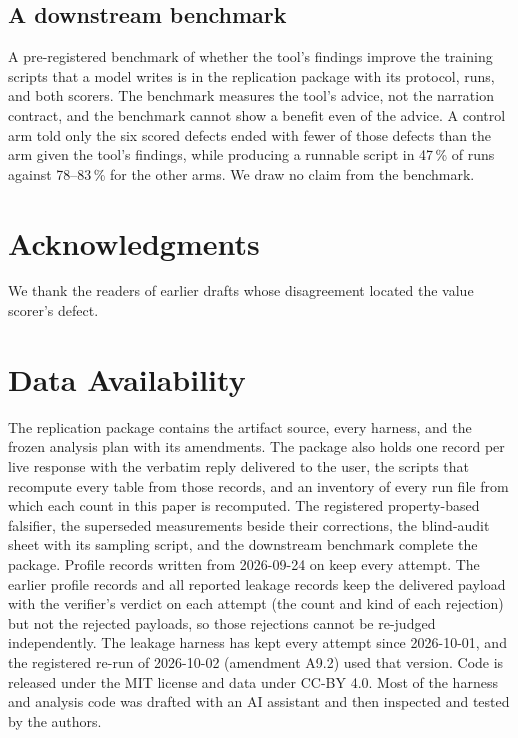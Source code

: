 \documentclass[10pt,twocolumn]{article}
\begin{document}
\subsection{A downstream benchmark}\label{app:benchmark}
A pre-registered benchmark of whether the tool's findings improve the training
scripts that a model writes is in the replication package with its protocol,
runs, and both scorers. The benchmark measures the tool's advice, not the
narration contract, and the benchmark cannot show a benefit even of the
advice. A control arm told only the six scored defects ended with fewer of
those defects than the arm given the tool's findings, while producing a
runnable script in 47\,\% of runs against 78--83\,\% for the other arms. We draw no claim from
the benchmark.

\section*{Acknowledgments}
We thank the readers of earlier drafts whose disagreement located the value
scorer's defect.



\section*{Data Availability}
The replication package \citep{replication} contains the artifact source,
every harness, and the frozen analysis plan with its amendments. The package
also holds one record per live response with the verbatim reply delivered to
the user, the scripts that recompute every table from those records, and an
inventory of every run file from which each count in this paper is
recomputed. The registered property-based falsifier, the superseded
measurements beside their corrections, the blind-audit sheet with its sampling
script, and the downstream benchmark complete the package.
Profile records written from 2026-09-24 on keep every attempt. The earlier
profile records and all reported leakage records keep the delivered payload
with the verifier's verdict on each attempt (the count and kind of each
rejection) but not the rejected payloads, so those rejections cannot be
re-judged independently. The leakage harness has kept every attempt since
2026-10-01, and the registered re-run of 2026-10-02 (amendment A9.2) used that
version. Code is released under the MIT
license and data under CC-BY 4.0. Most of the harness and analysis code was
drafted with an AI assistant and then inspected and tested by the authors.
\end{document}
